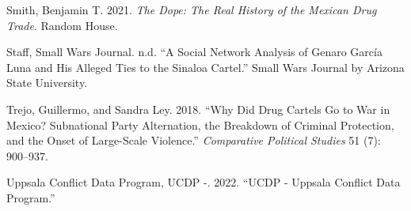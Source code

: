 \documentclass[
]{article}
\newlength{\cslhangindent}
\newenvironment{CSLReferences}[2] %
 {\begin{list}{}{%
  \setlength{\itemindent}{0pt}
  \setlength{\leftmargin}{0pt}
  \setlength{\parsep}{0pt}
  \ifodd #1
   \setlength{\leftmargin}{\cslhangindent}
   \setlength{\itemindent}{-1\cslhangindent}
  \fi
  \setlength{\itemsep}{#2\baselineskip}}}
 {\end{list}}
\begin{document}
\begin{CSLReferences}{1}{0}
Smith, Benjamin T. 2021. \emph{The Dope: The Real History of the Mexican
Drug Trade}. Random House.

Staff, Small Wars Journal. n.d. {``A Social Network Analysis of Genaro
García Luna and His Alleged Ties to the Sinaloa Cartel.''} Small Wars
Journal by Arizona State University.

Trejo, Guillermo, and Sandra Ley. 2018. {``Why Did Drug Cartels Go to
War in Mexico? Subnational Party Alternation, the Breakdown of Criminal
Protection, and the Onset of Large-Scale Violence.''} \emph{Comparative
Political Studies} 51 (7): 900--937.

Uppsala Conflict Data Program, UCDP -. 2022. {``UCDP - Uppsala Conflict
Data Program.''}

\end{CSLReferences}
\end{document}
